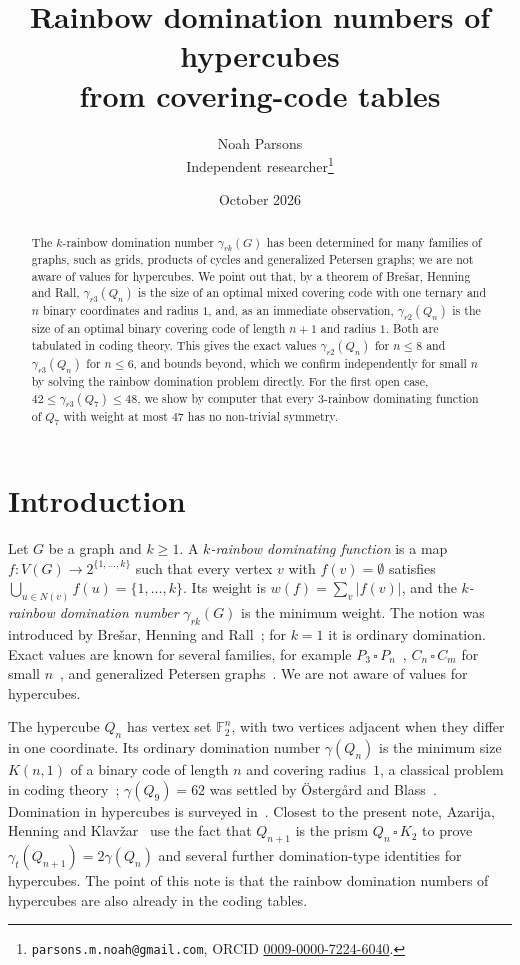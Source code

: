 \documentclass[11pt]{article}
\title{Rainbow domination numbers of hypercubes\\ from covering-code tables}
\author{Noah Parsons\\ \small Independent researcher\thanks{%
\texttt{parsons.m.noah@gmail.com}, ORCID \href{https://orcid.org/0009-0000-7224-6040}{0009-0000-7224-6040}.}}
\date{October 2026}
\theoremstyle{definition}
\theoremstyle{remark}
\newcommand{\F}{\mathbb{F}}
\begin{document}
\maketitle

\begin{abstract}
The $k$-rainbow domination number $\gamma_{rk}(G)$ has been determined for many families of
graphs, such as grids, products of cycles and generalized Petersen graphs; we are not aware of
values for hypercubes. We point out that, by a theorem of Brešar, Henning and Rall,
$\gamma_{r3}(Q_n)$ is the size of an optimal mixed covering code with one ternary and $n$ binary
coordinates and radius $1$, and, as an immediate observation, $\gamma_{r2}(Q_n)$ is the size of
an optimal binary covering code of length $n+1$ and radius $1$. Both are tabulated in coding
theory. This gives the exact
values $\gamma_{r2}(Q_n)$ for $n\le 8$ and $\gamma_{r3}(Q_n)$ for $n\le 6$, and bounds beyond,
which we confirm independently for small $n$ by solving the rainbow domination problem directly.
For the first open case, $42\le\gamma_{r3}(Q_7)\le 48$, we show by computer that every
$3$-rainbow dominating function of $Q_7$ with weight at most $47$ has no non-trivial symmetry.
\end{abstract}

\section{Introduction}

Let $G$ be a graph and $k\ge 1$. A \emph{$k$-rainbow dominating function} is a map
$f\colon V(G)\to 2^{\{1,\dots,k\}}$ such that every vertex $v$ with $f(v)=\emptyset$ satisfies
$\bigcup_{u\in N(v)} f(u)=\{1,\dots,k\}$. Its weight is $w(f)=\sum_v |f(v)|$, and the
\emph{$k$-rainbow domination number} $\gamma_{rk}(G)$ is the minimum weight. The notion was
introduced by Brešar, Henning and Rall~\cite{bhr}; for $k=1$ it is ordinary domination. Exact
values are known for several families, for example
$P_3\,\square\,P_n$~\cite{p3pn}, $C_n\,\square\,C_m$ for small $n$~\cite{cncm,c3cm}, and
generalized Petersen graphs~\cite{petersen}. We are not aware of values for hypercubes.

The hypercube $Q_n$ has vertex set $\F_2^n$, with two vertices adjacent when they differ in one
coordinate. Its ordinary domination number $\gamma(Q_n)$ is the minimum size $K(n,1)$ of a binary
code of length $n$ and covering radius~$1$, a classical problem in coding
theory~\cite{cohen-book}; $\gamma(Q_9)=62$ was settled by Östergård and Blass~\cite{ob}. Domination
in hypercubes is surveyed in~\cite{hhh}. Closest to the present note, Azarija, Henning and
Klavžar~\cite{ahk} use the fact that $Q_{n+1}$ is the prism $Q_n\,\square\,K_2$ to prove
$\gamma_t(Q_{n+1})=2\gamma(Q_n)$ and several further domination-type identities for hypercubes.
The point of this note is that the rainbow domination numbers of hypercubes are also already in
the coding tables.
\end{document}
